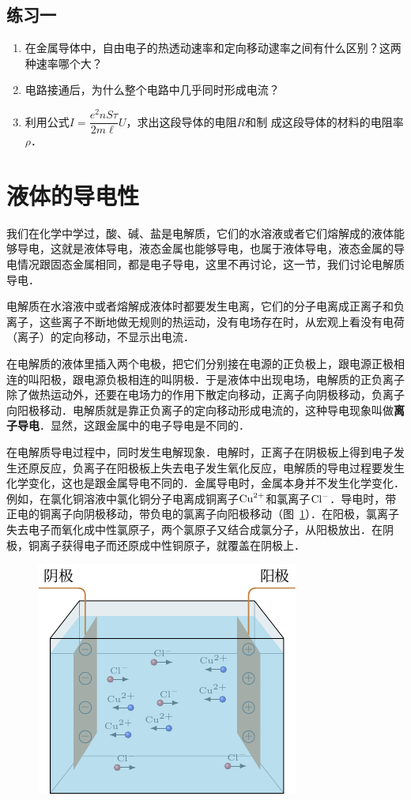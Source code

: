 \subsection*{练习一}
\begin{enumerate}
    \item 在金属导体中，自由电子的热透动速率和定向移动逮率之间有什么区别？这两种速率哪个大？
    \item 电路接通后，为什么整个电路中几乎同时形成电流？
    \item 利用公式$I=\dfrac{e^2 nS\tau}{2m\ell}U$，求出这段导体的电阻$R$和制
成这段导体的材料的电阻率$\rho$．
\end{enumerate}


\section{液体的导电性}
我们在化学中学过，酸、碱、盐是电解质，它们的水溶液或者它们熔解成的液体能够导电，这就是液体导电，液态金属也能够导电，也属于液体导电，液态金属的导电情况跟固态金属相同，都是电子导电，这里不再讨论，这一节，我们讨论电解质导电．

电解质在水溶液中或者熔解成液体时都要发生电离，它们的分子电离成正离子和负离子，这些离子不断地做无规则的热运动，没有电场存在时，从宏观上看没有电荷（离子）的定向移动，不显示出电流．

在电解质的液体里插入两个电极，把它们分别接在电源的正负极上，跟电源正极相连的叫阳极，跟电源负极相连的叫阴极．于是液体中出现电场，电解质的正负离子除了做热运动外，还要在电场力的作用下散定向移动，正离子向阴极移动，负离子向阳极移动．电解质就是靠正负离子的定向移动形成电流的，这种导电现象叫做\textbf{离子导电}．显然，这跟金属中的电子导电是不同的．

在电解质导电过程中，同时发生电解现象．电解时，正离子在阴极板上得到电子发生还原反应，负离子在阳极板上失去电子发生氧化反应，电解质的导电过程要发生化学变化，这也是跟金属导电不同的．金属导电时，金属本身并不发生化学变化．例如，在氯化铜溶液中氯化铜分子电离成铜离子${\rm Cu}^{2+}$和氯离子${\rm Cl}^-$．导电时，带正电的铜离子向阴极移动，带负电的氯离子向阳极移动（图~\ref{fig_B_8-3}）．在阳极，氯离子失去电子而氧化成中性氯原子，两个氯原子又结合成氯分子，从阳极放出．在阴极，铜离子获得电子而还原成中性铜原子，就覆盖在阴极上．
\begin{figure}[htbp]
    \centering
    \includegraphics{fig/B/8-3.pdf}
    \caption{}\label{fig_B_8-3}
\end{figure}

